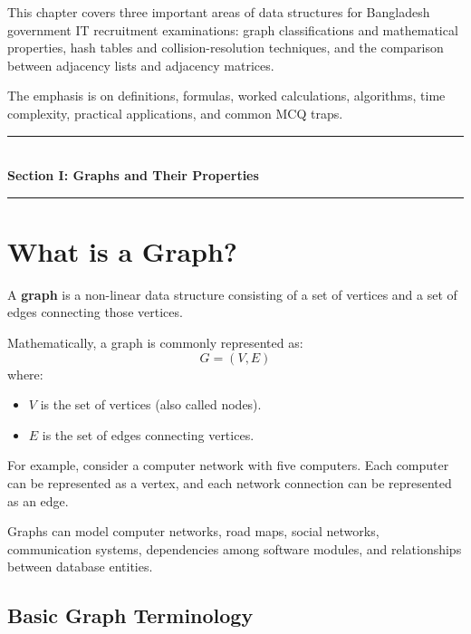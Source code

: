 This chapter covers three important areas of data structures for Bangladesh government IT recruitment examinations: graph classifications and mathematical properties, hash tables and collision-resolution techniques, and the comparison between adjacency lists and adjacency matrices.

The emphasis is on definitions, formulas, worked calculations, algorithms, time complexity, practical applications, and common MCQ traps.

\begin{center}
\vspace{0.5em}
{\color{primary}\rule{0.45\textwidth}{1.2pt}}\\[4pt]
{\Large\bfseries\color{primary} Section I: Graphs and Their Properties}\\[2pt]
{\color{primary}\rule{0.45\textwidth}{1.2pt}}
\vspace{0.5em}
\end{center}

\section{What is a Graph?}

A \textbf{graph} is a non-linear data structure consisting of a set of vertices and a set of edges connecting those vertices.

Mathematically, a graph is commonly represented as:
\[
G = (V, E)
\]
where:
\begin{itemize}
    \item $V$ is the set of vertices (also called nodes).
    \item $E$ is the set of edges connecting vertices.
\end{itemize}

For example, consider a computer network with five computers. Each computer can be represented as a vertex, and each network connection can be represented as an edge.

Graphs can model computer networks, road maps, social networks, communication systems, dependencies among software modules, and relationships between database entities.

\subsection{Basic Graph Terminology}

